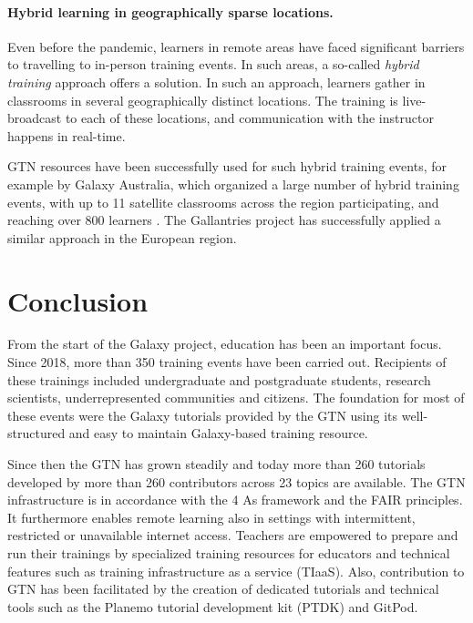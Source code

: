 \paragraph{Hybrid learning in geographically sparse locations.} 
Even before the pandemic, learners in remote areas have faced significant barriers to travelling to in-person training events. In such areas, a so-called \emph{hybrid training} \cite{Hall2021} approach offers a solution. In such an approach, learners gather in classrooms in several geographically distinct locations. The training is live-broadcast to each of these locations, and communication with the instructor happens in real-time. 

GTN resources have been successfully used for such hybrid training events, for example by Galaxy Australia, which organized a large number of hybrid training events, with up to 11 satellite classrooms across the region participating, and reaching over 800 learners \cite{Hall2021}. The Gallantries project \cite{gallantries} has successfully applied a similar approach in the European region.

\section*{Conclusion}

From the start of the Galaxy project, education has been an important focus. Since 2018, more than 350 training events have been carried out. Recipients of these trainings included undergraduate and postgraduate students, research scientists, underrepresented communities and citizens. The foundation for most of these events were the Galaxy tutorials provided by the GTN using its well-structured and easy to maintain Galaxy-based training resource. %

Since then the GTN has grown steadily and today more than 260 tutorials developed by more than 260 contributors across 23 topics are available. The GTN infrastructure is in accordance with the 4 As framework and the FAIR principles. It furthermore enables remote learning also in settings with intermittent, restricted or unavailable internet access. Teachers are empowered to prepare and run their trainings by specialized training resources for educators and technical features such as training infrastructure as a service (TIaaS). Also, contribution to GTN has been facilitated by the creation of dedicated tutorials and technical tools such as the Planemo tutorial development kit (PTDK) and GitPod.

